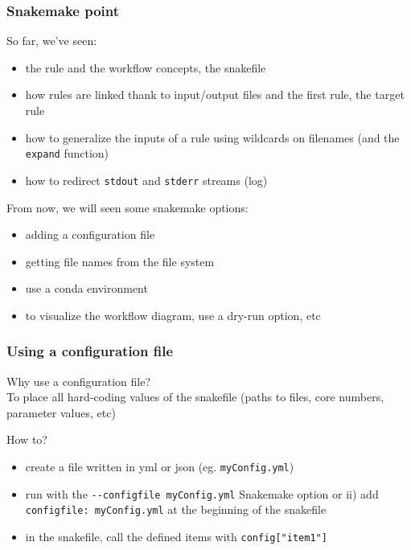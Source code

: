 \begin{frame}[containsverbatim]
\frametitle{Snakemake point}
\begin{block}{So far, we've seen:}
\begin{itemize}
    \item the rule and the workflow concepts, the snakefile
    \item how rules are linked thank to input/output files and the first rule, the target rule
    \item how to generalize the inputs of a rule using wildcards on filenames (and the \verb|expand| function)
    \item how to redirect \verb|stdout| and \verb|stderr| streams (log)
\end{itemize}
\end{block}
\begin{block}{From now, we will seen some snakemake options:}
\begin{itemize}
    \item adding a configuration file
    \item getting file names from the file system
    \item use a conda environment
    \item to visualize the workflow diagram, use a dry-run option, etc
\end{itemize}
\end{block}
\end{frame}
\begin{frame}[containsverbatim]
\frametitle{Using a configuration file}
Why use a configuration file?\\
To place all hard-coding values of the snakefile (paths to files, core numbers, parameter values, etc)
\begin{block}{How to?}
\begin{itemize}
    \item create a file written in yml or json (eg. \verb|myConfig.yml|)
    \item run with the \verb|--configfile myConfig.yml| Snakemake option or ii) add \verb|configfile: myConfig.yml| at the beginning of the snakefile
    \item in the snakefile, call the defined items with \verb|config["item1"]|
\end{itemize}
\end{block}
\end{frame}
